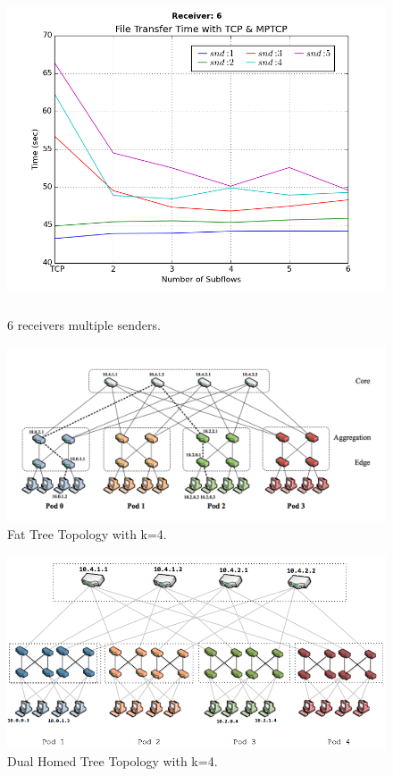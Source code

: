 \documentclass[10pt]{report}
\begin{document}
\begin{appendices}
  \begin{figure}
    \includegraphics[width=\textwidth,height=3.8in]{images/rcv_6.png}
    \caption{6 receivers multiple senders.}
    \label{fig:rcv6}
  \end{figure}

  \begin{figure}
    \includegraphics[width=\textwidth]{images/fattree.png}
    \caption{Fat Tree Topology with k=4.}
    \label{fig:ft}
  \end{figure}

  \begin{figure}
    \includegraphics[width=\textwidth]{images/dht.png}
    \caption{Dual Homed Tree Topology with k=4.}
    \label{fig:dht}
  \end{figure}

\end{appendices}

{}

\end{document}
